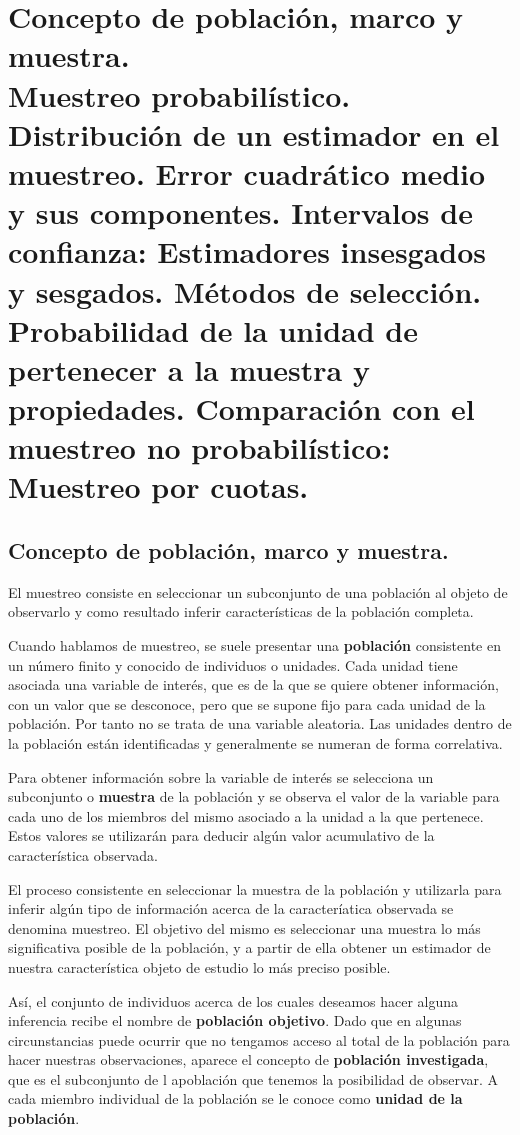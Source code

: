 
\chapter[Concepto de poblaci\'on, marco y muestra.]{Concepto de poblaci\'on, marco y muestra.\\
	\normalsize Muestreo probabil\'istico. Distribuci\'on de un estimador en el muestreo. Error cuadr\'atico medio y sus componentes. Intervalos de confianza: Estimadores insesgados y sesgados. M\'etodos de selecci\'on. Probabilidad de la unidad de pertenecer a la muestra y propiedades. Comparaci\'on con el muestreo no probabil\'istico: Muestreo por cuotas.}

\section{Concepto de poblaci\'on, marco y muestra.}

El muestreo consiste en seleccionar un subconjunto de una poblaci\'on al objeto de observarlo y como resultado inferir caracter\'isticas
de la poblaci\'on completa. 

Cuando hablamos de muestreo, se suele presentar una \textbf{poblaci\'on} consistente en un n\'umero finito y conocido de individuos o unidades. Cada unidad tiene asociada una variable de inter\'es, que es de la que se quiere obtener informaci\'on, con un valor que se desconoce, pero que se supone fijo para cada unidad de la poblaci\'on. Por tanto no se trata de una variable aleatoria. Las unidades dentro de la poblaci\'on est\'an identificadas y generalmente se numeran de forma correlativa.

Para obtener informaci\'on sobre la variable de inter\'es se selecciona un subconjunto o \textbf{muestra} de la poblaci\'on y se observa el valor de la variable para cada uno de los miembros del mismo asociado a la unidad a la que pertenece. Estos valores se utilizar\'an para deducir alg\'un valor acumulativo de la caracter\'istica observada.

El proceso consistente en seleccionar la muestra de la poblaci\'on y utilizarla para inferir alg\'un tipo de informaci\'on acerca de la caracter\'iatica observada se denomina muestreo. El objetivo del mismo es seleccionar una muestra lo m\'as significativa posible de la poblaci\'on, y a partir de ella obtener un estimador de nuestra caracter\'istica objeto de estudio lo m\'as preciso posible.

As\'i, el conjunto de individuos acerca de los cuales deseamos hacer alguna inferencia recibe el nombre de \textbf{poblaci\'on objetivo}. Dado que en algunas circunstancias puede ocurrir que no tengamos acceso al total de la poblaci\'on para hacer nuestras observaciones, aparece el concepto de \textbf{poblaci\'on investigada}, que es el subconjunto de l apoblaci\'on que tenemos la posibilidad de observar. A cada miembro individual de la poblaci\'on se le conoce como \textbf{unidad de la poblaci\'on}.

